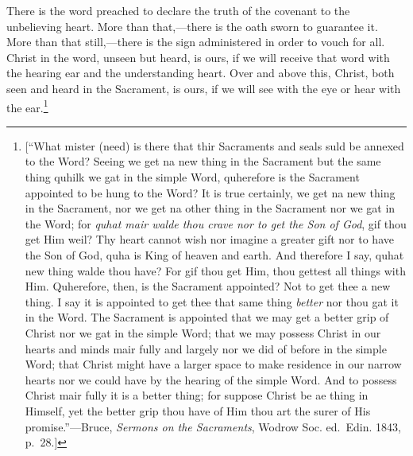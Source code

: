 \documentclass[
  english,
]{book}
\begin{document}
There is the word preached to declare the truth of the covenant to the unbelieving heart. More than that,---there is the oath sworn to guarantee it. More than that still,---there is the sign administered in order to vouch for all. Christ in the word, unseen but heard, is ours, if we will receive that word with the hearing ear and the understanding heart. Over and above this, Christ, both seen and heard in the Sacrament, is ours, if we will see with the eye or hear with the ear.\footnote{{[}``What mister (need) is there that thir Sacraments and seals suld be annexed to the Word? Seeing we get na new thing in the Sacrament but the same thing quhilk we gat in the simple Word, quherefore is the Sacrament appointed to be hung to the Word? It is true certainly, we get na new thing in the Sacrament, nor we get na other thing in the Sacrament nor we gat in the Word; for \emph{quhat mair walde thou crave nor to get the Son of God}, gif thou get Him weil? Thy heart cannot wish nor imagine a greater gift nor to have the Son of God, quha is King of heaven and earth. And therefore I say, quhat new thing walde thou have? For gif thou get Him, thou gettest all things with Him. Quherefore, then, is the Sacrament appointed? Not to get thee a new thing. I say it is appointed to get thee that same thing \emph{better} nor thou gat it in the Word. The Sacrament is appointed that we may get a better grip of Christ nor we gat in the simple Word; that we may possess Christ in our hearts and minds mair fully and largely nor we did of before in the simple Word; that Christ might have a larger space to make residence in our narrow hearts nor we could have by the hearing of the simple Word. And to possess Christ mair fully it is a better thing; for suppose Christ be ae thing in Himself, yet the better grip thou have of Him thou art the surer of His promise.''---Bruce, \emph{Sermons on the Sacraments}, Wodrow Soc. ed.~Edin. 1843, p.~28.{]}}
\end{document}
